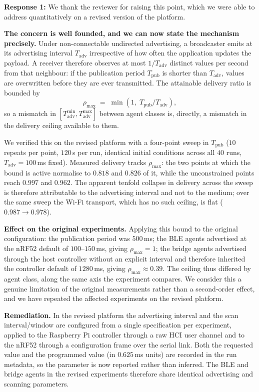 \item \textbf{Response 1:} We thank the reviewer for raising this point, which we
were able to address quantitatively on a revised version of the platform.

\textbf{The concern is well founded, and we can now state the mechanism precisely.}
Under non-connectable undirected advertising, a broadcaster emits at its advertising
interval $T_\mathrm{adv}$ irrespective of how often the application updates the
payload. A receiver therefore observes at most $1/T_\mathrm{adv}$ distinct values per
second from that neighbour: if the publication period $T_\mathrm{pub}$ is shorter
than $T_\mathrm{adv}$, values are overwritten before they are ever transmitted. The
attainable delivery ratio is bounded by
\[
  \rho_{\max} \;=\; \min\!\left(1,\; T_\mathrm{pub}/T_\mathrm{adv}\right),
\]
so a mismatch in $[T_\mathrm{adv}^\mathrm{min}, T_\mathrm{adv}^\mathrm{max}]$ between
agent classes is, directly, a mismatch in the delivery ceiling available to them.

We verified this on the revised platform with a four-point sweep in $T_\mathrm{pub}$
($10$ repeats per point, $120$\,s per run, identical initial conditions across all
$40$ runs, $T_\mathrm{adv}=100$\,ms fixed). Measured delivery tracks $\rho_{\max}$:
the two points at which the bound is active normalise to $0.818$ and $0.826$ of it,
while the unconstrained points reach $0.997$ and $0.962$. The apparent tenfold
collapse in delivery across the sweep is therefore attributable to the advertising
interval and not to the medium; over the same sweep the Wi-Fi transport, which has no
such ceiling, is flat ($0.987 \rightarrow 0.978$).

\textbf{Effect on the original experiments.} Applying this bound to the original
configuration: the publication period was $500$\,ms; the BLE agents advertised at the
nRF52 default of $100$--$150$\,ms, giving $\rho_{\max}=1$; the bridge agents
advertised through the host controller without an explicit interval and therefore
inherited the controller default of $1280$\,ms, giving $\rho_{\max}\approx0.39$.
The ceiling thus differed by agent class, along the same axis the experiment
compares. We consider this a genuine limitation of the original measurements rather
than a second-order effect, and we have repeated the affected experiments on the
revised platform.

\textbf{Remediation.} In the revised platform the advertising interval and the
scan interval/window are configured from a single specification per experiment,
applied to the Raspberry Pi controller through a raw HCI user channel and to the
nRF52 through a configuration frame over the serial link. Both the requested value
and the programmed value (in $0.625$\,ms units) are recorded in the run metadata, so
the parameter is now reported rather than inferred. The BLE and bridge agents in the
revised experiments therefore share identical advertising and scanning parameters.

